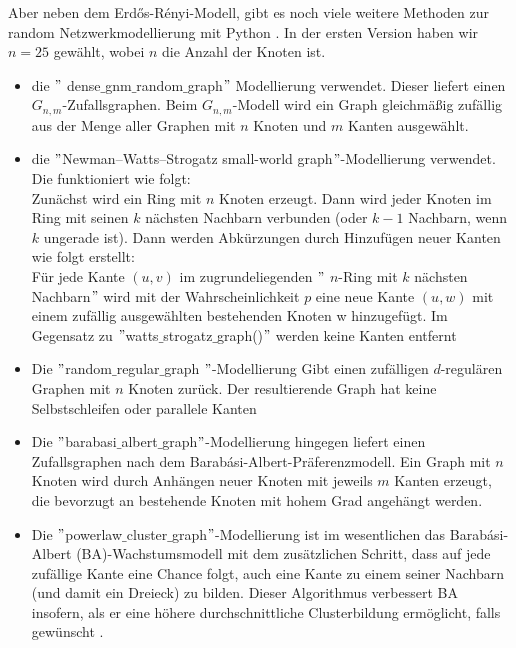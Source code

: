 Aber neben dem Erdős-Rényi-Modell, gibt es noch viele weitere Methoden zur random Netzwerkmodellierung mit Python \cite{Generators}. In der ersten Version haben wir $n = 25$ gewählt, wobei $n$ die Anzahl der Knoten ist.
\begin{itemize}
    \item die $"$ dense$\_$gnm$\_$random$\_$graph$"$ Modellierung verwendet. Dieser liefert einen $G_{n,m}$-Zufallsgraphen.
    Beim $G_{n,m}$-Modell wird ein Graph gleichmäßig zufällig aus der Menge aller Graphen mit $n$ Knoten und $m$ Kanten ausgewählt.
    \item die $"$Newman–Watts–Strogatz small-world graph$"$-Modellierung verwendet. Die funktioniert wie folgt: \\
    Zunächst wird ein Ring mit $n$ Knoten erzeugt. Dann wird jeder Knoten im Ring mit seinen $k$ nächsten Nachbarn verbunden (oder $k - 1$ Nachbarn, wenn $k$ ungerade ist). Dann werden Abkürzungen durch Hinzufügen neuer Kanten wie folgt erstellt: \\
    Für jede Kante $(u, v)$ im zugrundeliegenden $"$ $n$-Ring mit $k$ nächsten Nachbarn$"$ wird mit der Wahrscheinlichkeit $p$ eine neue Kante $(u, w)$ mit einem zufällig ausgewählten bestehenden Knoten w hinzugefügt. Im Gegensatz zu $"$watts$\_$strogatz$\_$graph()$"$ werden keine Kanten entfernt
    \item Die $"$random$\_$regular$\_$graph $"$-Modellierung Gibt einen zufälligen $d$-regulären Graphen mit $n$ Knoten zurück.
    Der resultierende Graph hat keine Selbstschleifen oder parallele Kanten
    \item Die $"$barabasi$\_$albert$\_$graph$"$-Modellierung hingegen liefert einen Zufallsgraphen nach dem Barabási-Albert-Präferenzmodell.
    Ein Graph mit $n$ Knoten wird durch Anhängen neuer Knoten mit jeweils $m$ Kanten erzeugt, die bevorzugt an bestehende Knoten mit hohem Grad angehängt werden.
    \item Die $"$powerlaw$\_$cluster$\_$graph$"$-Modellierung ist im wesentlichen das Barabási-Albert (BA)-Wachstumsmodell mit dem zusätzlichen Schritt, dass auf jede zufällige Kante eine Chance folgt, auch eine Kante zu einem seiner Nachbarn (und damit ein Dreieck) zu bilden. Dieser Algorithmus verbessert BA insofern, als er eine höhere durchschnittliche Clusterbildung ermöglicht, falls gewünscht \cite{Generators}.
\end{itemize}

